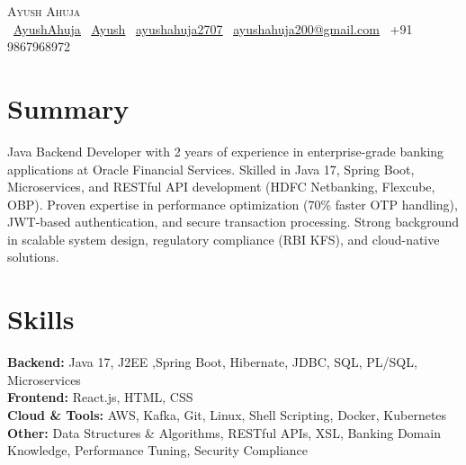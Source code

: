 \documentclass[letterpaper,11pt]{article}
\begin{document}
\begin{center}
    {\Huge \scshape Ayush Ahuja} \\ \vspace{4pt}
    \vspace{2mm}
    \small
    \faGithub\ \href{https://github.com/AyushAhuja2707}{\underline{AyushAhuja}} \quad
    \faLinkedin\ \href{https://www.linkedin.com/in/ayush-ahuja-790b75187/}{\underline{Ayush}} \quad
    \faGlobe\ \href{https://ayushahuja2707.github.io/Resume_Ayush/ }{\underline{ayushahuja2707}} \quad
    \faEnvelope\ \href{mailto:ayushahuja200@gmail.com}{\underline{ayushahuja200@gmail.com}} \quad
    \faPhone\ +91 9867968972
\end{center}

\section{Summary}
\small{
Java Backend Developer with 2 years of experience in enterprise-grade banking applications at Oracle Financial Services. Skilled in Java 17, Spring Boot, Microservices, and RESTful API development (HDFC Netbanking, Flexcube, OBP). Proven expertise in performance optimization (70\% faster OTP handling), JWT-based authentication, and secure transaction processing. Strong background in scalable system design, regulatory compliance (RBI KFS), and cloud-native solutions.
}

\section{Skills}
 \begin{itemize}[leftmargin=0.15in, label={}]
    \small{\item{
     \textbf{Backend:} Java 17, J2EE ,Spring Boot, Hibernate, JDBC, SQL, PL/SQL, Microservices  \\
     \vspace{1mm}
     \textbf{Frontend:} React.js, HTML, CSS \\
     \vspace{1mm}
     \textbf{Cloud \& Tools:} AWS, Kafka, Git, Linux, Shell Scripting, Docker, Kubernetes \\
     \vspace{1mm}
     \textbf{Other:} Data Structures \& Algorithms, RESTful APIs, XSL, Banking Domain Knowledge, Performance Tuning, Security Compliance
    }}
 \end{itemize}
\end{document}

